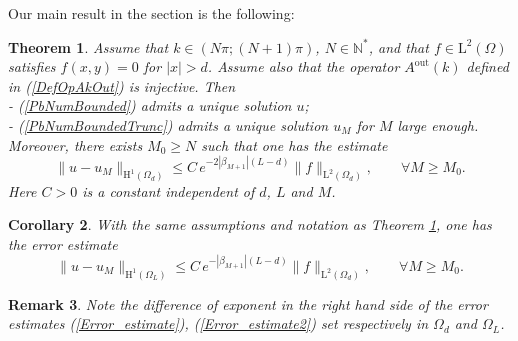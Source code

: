 \documentclass[11pt,a4paper]{report}
\newcommand{\Om}{\Omega}
\newcommand{\mrm}[1]{\mathrm{#1}}
\newcommand{\N}{\mathbb{N}}
\newcommand{\mL}{\mrm{L}}
\newcommand{\mH}{\mrm{H}}
\newtheorem{theorem}{Theorem}[chapter]
\newtheorem{remark}[theorem]{Remark}
\newtheorem{corollary}[theorem]{Corollary}
\begin{document}
\noindent Our main result in the section is the following:
\begin{theorem}\label{MainThm}
Assume that $k\in(N\pi;(N+1)\pi)$, $N\in\N^\ast$, and that $f\in\mL^2(\Om)$ satisfies $f(x,y)=0$ for $|x|>d$. Assume also that the operator $A^{\mrm{out}}(k)$ defined in (\ref{DefOpAkOut}) is injective. Then\\[3pt]
-  (\ref{PbNumBounded}) admits a unique solution $u$;\\[2pt]
- (\ref{PbNumBoundedTrunc}) admits a unique solution $u_M$ for $M$ large enough.\\[4pt]
Moreover, there exists $M_0\ge N$ such that one has the estimate
\begin{equation}\label{Error_estimate}
\|u-u_M\|_{\mH^1(\Om_d)} \le C\,e^{-2|\beta_{M+1}|(L-d)}\|f\|_{\mrm{L}^2(\Om_d)},\qquad\forall M\ge M_0.
\end{equation}
Here $C>0$ is a constant independent of $d$, $L$ and $M$.
\end{theorem}
\begin{corollary}\label{CoroMainThm}
With the same assumptions and notation as Theorem \ref{MainThm}, one has the error estimate
\begin{equation}\label{Error_estimate2}
\|u-u_M\|_{\mH^1(\Om_L)} \le C\,e^{-|\beta_{M+1}|(L-d)}\|f\|_{\mrm{L}^2(\Om_d)},\qquad\forall M\ge M_0.
\end{equation}
\end{corollary}
\begin{remark}
Note the difference of exponent in the right hand side of the error estimates (\ref{Error_estimate}), (\ref{Error_estimate2}) set respectively in $\Om_d$ and $\Om_L$. 
\end{remark}
\end{document}
